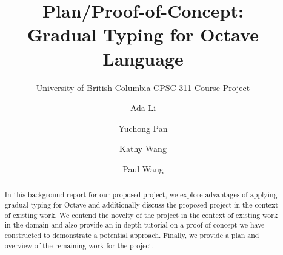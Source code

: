 \documentclass[sigplan, xcolor=usenames,dvipsnames]{acmart}
\begin{document}
\title{Plan/Proof-of-Concept: \\Gradual Typing for Octave Language}
\subtitle{University of British Columbia CPSC 311 Course Project}


\author{Ada Li}

\author{Yuchong Pan}

\author{Kathy Wang}

\author{Paul Wang}


\begin{abstract}
In this background report for our proposed project, we explore advantages of applying gradual typing for Octave and additionally discuss the proposed project in the context of existing work. We contend the novelty of the project in the context of existing work in the domain and also provide an in-depth tutorial on a proof-of-concept we have constructed to demonstrate a potential approach. Finally, we provide a plan and overview of the remaining work for the project.
\end{abstract}




\maketitle





\end{document}
